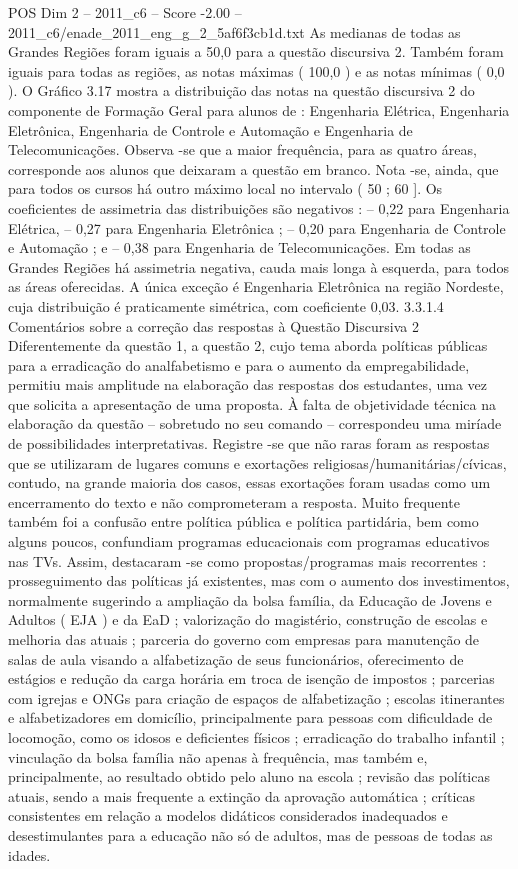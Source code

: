\begin{textsample}{POS Dim 2 – 2011\_c6 – Score -2.00 – 2011\_c6/enade\_2011\_eng\_g\_2\_5af6f3cb1d.txt}
As medianas de todas as Grandes Regiões foram iguais a 50,0 para a questão discursiva 2.
Também foram iguais para todas as regiões, as notas máximas ( 100,0 ) e as notas mínimas ( 0,0 ).
O Gráfico 3.17 mostra a distribuição das notas na questão discursiva 2 do componente de Formação Geral para alunos de : Engenharia Elétrica, Engenharia Eletrônica, Engenharia de Controle e Automação e Engenharia de Telecomunicações.
Observa -se que a maior frequência, para as quatro áreas, corresponde aos alunos que deixaram a questão em branco.
Nota -se, ainda, que para todos os cursos há outro máximo local no intervalo ( 50 ; 60 ].
Os coeficientes de assimetria das distribuições são negativos : – 0,22 para Engenharia Elétrica, – 0,27 para Engenharia Eletrônica ; – 0,20 para Engenharia de Controle e Automação ; e – 0,38 para Engenharia de Telecomunicações.
Em todas as Grandes Regiões há assimetria negativa, cauda mais longa à esquerda, para todos as áreas oferecidas.
A única exceção é Engenharia Eletrônica na região Nordeste, cuja distribuição é praticamente simétrica, com coeficiente 0,03. 3.3.1.4 Comentários sobre a correção das respostas à Questão Discursiva 2 Diferentemente da questão 1, a questão 2, cujo tema aborda políticas públicas para a erradicação do analfabetismo e para o aumento da empregabilidade, permitiu mais amplitude na elaboração das respostas dos estudantes, uma vez que solicita a apresentação de uma proposta.
À falta de objetividade técnica na elaboração da questão – sobretudo no seu comando – correspondeu uma miríade de possibilidades interpretativas.
Registre -se que não raras foram as respostas que se utilizaram de lugares comuns e exortações religiosas/humanitárias/cívicas, contudo, na grande maioria dos casos, essas exortações foram usadas como um encerramento do texto e não comprometeram a resposta.
Muito frequente também foi a confusão entre política pública e política partidária, bem como alguns poucos, confundiam programas educacionais com programas educativos nas TVs.
Assim, destacaram -se como propostas/programas mais recorrentes : prosseguimento das políticas já existentes, mas com o aumento dos investimentos, normalmente sugerindo a ampliação da bolsa família, da Educação de Jovens e Adultos ( EJA ) e da EaD ; valorização do magistério, construção de escolas e melhoria das atuais ; parceria do governo com empresas para manutenção de salas de aula visando a alfabetização de seus funcionários, oferecimento de estágios e redução da carga horária em troca de isenção de impostos ; parcerias com igrejas e ONGs para criação de espaços de alfabetização ; escolas itinerantes e alfabetizadores em domicílio, principalmente para pessoas com dificuldade de locomoção, como os idosos e deficientes físicos ; erradicação do trabalho infantil ; vinculação da bolsa família não apenas à frequência, mas também e, principalmente, ao resultado obtido pelo aluno na escola ; revisão das políticas atuais, sendo a mais frequente a extinção da aprovação automática ; críticas consistentes em relação a modelos didáticos considerados inadequados e desestimulantes para a educação não só de adultos, mas de pessoas de todas as idades.

\end{textsample}
